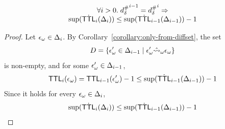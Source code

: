 \begin{lemma}\label{lemma:dec-ttl}
  \[
    \begin{array}{c}
      \forall i > 0. \; {{d}^{\#}_\delta}^{i-1} = {{d}^{\#}_\delta}^i \Rightarrow \\
      \sup(\dot {\textsf{TTL}}_i(\Delta_i)) \leq \sup(\dot {\textsf{TTL}}_{i-1}(\Delta_{i-1})) - 1
    \end{array}
  \]
\end{lemma}
\begin{proof}
  Let ${\epsilon}_\omega \in \Delta_i$.
  By Corollary~\ref{corollary:only-from-diffset}, the set
  \[
    D = \{{\epsilon}_\omega' \in \Delta_{i-1} \mid {\epsilon}_\omega' \hat{\leadsto}_\omega {\epsilon}_\omega\}
  \]
  is non-empty, and for some ${\epsilon}_\omega' \in \Delta_{i-1}$,
  \[
    \textsf{TTL}_i({\epsilon}_\omega) = \textsf{TTL}_{i-1}({\epsilon}_\omega') - 1 \leq \sup(\dot {\textsf{TTL}}_{i-1}(\Delta_{i-1})) - 1
  \]
  Since it holds for every ${\epsilon}_\omega \in \Delta_i$,
  \[
    \sup(\dot {\textsf{TTL}}_i(\Delta_i)) \leq \sup(\dot {\textsf{TTL}}_{i-1}(\Delta_{i-1})) - 1
  \]
\end{proof}
